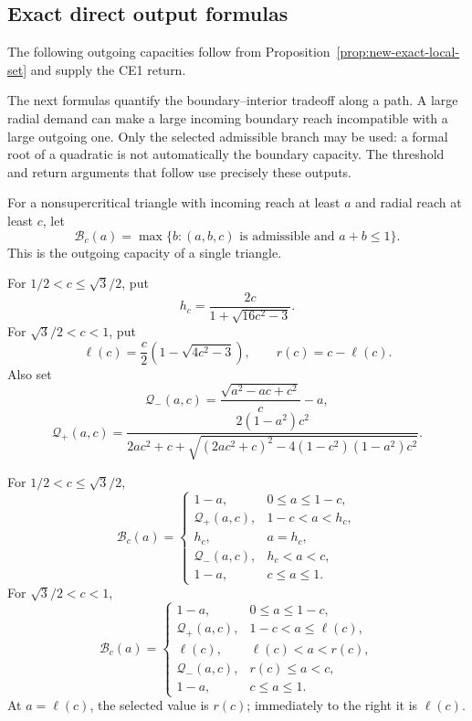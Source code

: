\subsection{Exact direct output formulas}
\label{subsec:new-direct-output-formulas}

The following outgoing capacities follow from
Proposition~\ref{prop:new-exact-local-set} and supply the CE1 return.

The next formulas quantify the boundary--interior tradeoff along a path.
A large radial demand can make a large incoming boundary reach incompatible
with a large outgoing one. Only the selected admissible branch may be used:
a formal root of a quadratic is not automatically the boundary capacity.
The threshold and return arguments that follow use precisely these outputs.

For a nonsupercritical triangle with incoming reach at least $a$ and radial
reach at least $c$, let
\[
 \mathcal B_c(a)=
 \max\{b:(a,b,c)\text{ is admissible and }a+b\le1\}.
\]
This is the outgoing capacity of a single triangle.

For $1/2<c\le\sqrt3/2$, put
\[
 h_c=\frac{2c}{1+\sqrt{16c^2-3}}.
\]
For $\sqrt3/2<c<1$, put
\[
 \ell(c)=\frac c2\left(1-\sqrt{4c^2-3}\right),
 \qquad r(c)=c-\ell(c).
\]
Also set
\[
 \mathcal Q_-(a,c)=\frac{\sqrt{a^2-ac+c^2}}c-a,
\]
\[
 \mathcal Q_+(a,c)=
 \frac{2(1-a^2)c^2}
 {2ac^2+c+
 \sqrt{(2ac^2+c)^2-4(1-c^2)(1-a^2)c^2}}.
\]

\begin{proposition}
\label{prop:new-four-direct-outputs}
For $1/2<c\le\sqrt3/2$,
\[
 \mathcal B_c(a)=
 \begin{cases}
  1-a,&0\le a\le1-c,\\
  \mathcal Q_+(a,c),&1-c<a<h_c,\\
  h_c,&a=h_c,\\
  \mathcal Q_-(a,c),&h_c<a<c,\\
  1-a,&c\le a\le1.
 \end{cases}
\]
For $\sqrt3/2<c<1$,
\[
 \mathcal B_c(a)=
 \begin{cases}
  1-a,&0\le a\le1-c,\\
  \mathcal Q_+(a,c),&1-c<a\le\ell(c),\\
  \ell(c),&\ell(c)<a<r(c),\\
  \mathcal Q_-(a,c),&r(c)\le a<c,\\
  1-a,&c\le a\le1.
 \end{cases}
\]
At $a=\ell(c)$, the selected value is $r(c)$; immediately to the right it is
$\ell(c)$.
\end{proposition}

